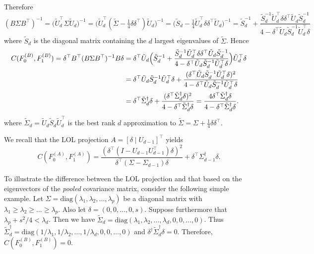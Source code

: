 \documentclass[10pt]{article}
\begin{document}
Therefore
$$ (B \Sigma B^{\top})^{-1} = \bigl(\tilde{U}_{d}^{\top} \Sigma \tilde{U}_d \bigr)^{-1} = \bigl( \tilde{U}_d^{\top} (\tilde{\Sigma} - \tfrac{1}{4} \delta \delta^{\top}) \tilde{U}_d\bigr)^{-1} = \bigl(\tilde{S}_d - \tfrac{1}{4} \tilde{U}_d^{\top} \delta \delta^{\top} \tilde{U}_d \bigr)^{-1} = \tilde{S}_d^{-1} + \frac{\tilde{S}_d^{-1} \tilde{U}_d^{\top} \delta \delta^{\top} \tilde{U}_d \tilde{S}_d^{-1}}{4 - \delta^{\top} \tilde{U}_d \tilde{S}_d^{-1} \tilde{U}_d^{\top} \delta} $$
where $\tilde{S}_d$ is the diagonal matrix containing the $d$ largest eigenvalues of $\tilde{\Sigma}$. Hence
\begin{equation}
\begin{split}
C(F_0^{(B)}, F_1^{(B)}) = \delta^{\top} B^{\top} (B \Sigma B^{\top})^{-1} B \delta & = \delta^{\top} \tilde{U}_d \Bigl(\tilde{S}_d^{-1} + \frac{\tilde{S}_d^{-1} \tilde{U}_d^{\top} \delta \delta^{\top} \tilde{U}_d \tilde{S}_d^{-1}}{4 - \delta^{\top} \tilde{U}_d \tilde{S}_d^{-1} \tilde{U}_d^{\top} \delta} \Bigr) \tilde{U}_d^{\top} \delta \\ &= \delta^{\top} \tilde{U}_d \tilde{S}_d^{-1} \tilde{U}_d^{\top} \delta + \frac{(\delta^{\top} \tilde{U}_d \tilde{S}_d^{-1} \tilde{U}_d^{\top} \delta)^{2}}{4 - \delta^{\top} \tilde{U}_d \tilde{S}_d^{-1} \tilde{U}_d^{\top} \delta} \\
&= \delta^{\top} \tilde{\Sigma}_d^{\dagger} \delta + \frac{(\delta^{\top} \tilde{\Sigma}_d^{\dagger} \delta)^2}{4 - \delta^{\top} \tilde{\Sigma}_d^{\dagger} \delta} = \frac{4 \delta^{\top} \tilde{\Sigma}_d^{\dagger} \delta}{4 - \delta^{\top} \tilde{\Sigma}_d^{\dagger} \delta}.
\end{split}
\end{equation}
where $\tilde{\Sigma}_d = \tilde{U}_d \tilde{S}_d \tilde{U}_d^{\top}$ is the best rank $d$ approximation to $\tilde{\Sigma} = \Sigma + \tfrac{1}{4} \delta \delta^{\top}$.

We recall that the LOL projection $A = [\delta \mid U_{d-1}]^{\top}$ yields
$$ C(F_0^{(A)}, F_1^{(A)}) = \frac{(\delta^{\top} (I - U_{d-1} U_{d-1}^{\top}) \delta)^{2}}{\delta^{\top} (\Sigma - \Sigma_{d-1}) \delta} + \delta^{\top} \Sigma_{d-1}^{\dagger} \delta. $$

To illustrate the difference between the LOL projection and that based on the eigenvectors of the {\em pooled} covariance matrix, consider the following simple example. Let $\Sigma = \mathrm{diag}(\lambda_1, \lambda_2, \dots, \lambda_p)$ be a diagonal matrix with $\lambda_1 \geq \lambda_2 \geq \dots \geq \lambda_p$. Also let $\delta = (0,0,\dots,0,s)$. Suppose furthermore that $\lambda_p + s^{2}/4 < \lambda_d$. Then we have $\tilde{\Sigma}_d = \mathrm{diag}(\lambda_1, \lambda_2, \dots, \lambda_d, 0, 0, \dots, 0)$. Thus $\tilde{\Sigma}_d^{\dagger} = \mathrm{diag}(1/\lambda_1, 1/\lambda_2, \dots, 1/\lambda_d, 0,0, \dots, 0)$ and $\delta^{\dagger} \tilde{\Sigma}_d^{\dagger} \delta = 0$. Therefore, $C(F_0^{(B)}, F_1^{(B)}) = 0$.
\end{document}
